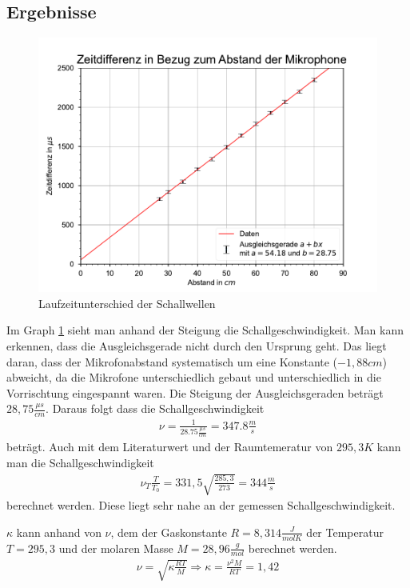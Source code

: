 \documentclass[11pt, a4paper]{article}
\begin{document}
    \subsection{Ergebnisse}
    \begin{figure}[h]
        
        \includegraphics{./2Mikros.pdf}

        \caption{Laufzeitunterschied der Schallwellen}
        \label{fig:graph2}
    \end{figure}
    Im Graph \ref{fig:graph2} sieht man anhand der Steigung die Schallgeschwindigkeit. Man kann erkennen, dass die Ausgleichsgerade nicht durch den Ursprung geht. Das liegt daran,
    dass der Mikrofonabstand systematisch um eine Konstante ($-1,88cm$) abweicht, da die Mikrofone unterschiedlich gebaut und unterschiedlich in die 
    Vorrischtung eingespannt waren. Die Steigung der Ausgleichsgeraden beträgt $28,75\frac{\mu s}{cm}$. Daraus folgt
    dass die Schallgeschwindigkeit
    \begin{align}
        \nu = \frac{1}{28.75\frac{\mu s}{cm}} = 347.8\frac{m}{s}
    \end{align}
    beträgt. Auch mit dem Literaturwert und der Raumtemeratur von $295,3K$ kann man die Schallgeschwindigkeit
    \begin{align}
        \nu_T\frac{T}{T_0} = 331,5 \sqrt{\frac{285,3}{273}} = 344\frac{m}{s}
    \end{align}
    berechnet werden. Diese liegt sehr nahe an der gemessen Schallgeschwindigkeit.

    $\kappa$ kann anhand von $\nu$, dem der Gaskonstante $R = 8,314 \frac{J}{molK}$ der Temperatur $T=295,3$ und der molaren Masse $M=28,96\frac{g}{mol}$ berechnet werden.
    \begin{align}
        \nu = \sqrt{\kappa \frac{RT}{M}} \Rightarrow \kappa = \frac{\nu^2 M}{RT}=1,42
    \end{align}
\end{document}
